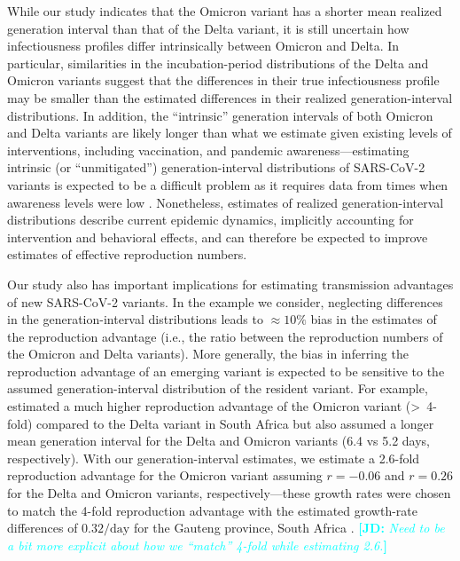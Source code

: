 \documentclass[12pt]{article}
\newcommand{\comment}{\showcomment}
\newcommand{\showcomment}[3]{\textcolor{#1}{\textbf{[#2: }\textsl{#3}\textbf{]}}}
\newcommand{\jd}[1]{\comment{cyan}{JD}{#1}}
\begin{document}
While our study indicates that the Omicron variant has a shorter mean realized generation interval than that of the Delta variant, it is still uncertain how infectiousness profiles differ intrinsically between Omicron and Delta.
In particular, similarities in the incubation-period distributions of the Delta and Omicron variants suggest that the differences in their true infectiousness profile may be smaller than the estimated differences in their realized generation-interval distributions.
In addition, the ``intrinsic'' generation intervals of both Omicron and Delta variants are likely longer than what we estimate given existing levels of interventions, including vaccination, and pandemic awareness---estimating intrinsic (or ``unmitigated'') generation-interval distributions of SARS-CoV-2 variants is expected to be a difficult problem as it requires data from times when awareness levels were low \citep{sender2021unmitigated}.
Nonetheless, estimates of realized generation-interval distributions describe current epidemic dynamics, implicitly accounting for intervention and behavioral effects,
and can therefore be expected to improve estimates of effective reproduction numbers.

Our study also has important implications for estimating transmission advantages of new SARS-CoV-2 variants.
In the example we consider, neglecting differences in the generation-interval distributions leads to $\approx 10\%$ bias in the estimates of the reproduction advantage (i.e., the ratio between the reproduction numbers of the Omicron and Delta variants).
More generally, the bias in inferring the reproduction advantage of an emerging variant is expected to be sensitive to the assumed generation-interval distribution of the resident variant.
For example, \cite{pearson2021bounding} estimated a much higher reproduction advantage of the Omicron variant (\textgreater\ 4-fold) compared to the Delta variant in South Africa but also assumed a longer mean generation interval for the Delta and Omicron variants (6.4 vs 5.2 days, respectively).
With our generation-interval estimates, we estimate a 2.6-fold reproduction advantage for the Omicron variant assuming $r=-0.06$ and $r=0.26$ for the Delta and Omicron variants, respectively---these growth rates were chosen to match the 4-fold reproduction advantage with the estimated growth-rate differences of $0.32/\mathrm{day}$ for the Gauteng province, South Africa \cite{pearson2021bounding}.
\jd{Need to be a bit more explicit about how we ``match'' 4-fold while estimating 2.6.}
\end{document}
